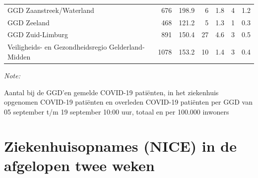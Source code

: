\documentclass[
  english,
  man,floatsintext]{apa6}
\begin{document}
\begin{table}
\begin{threeparttable}
\begin{tabular}{lrrrrrr}
GGD Zaanstreek/Waterland & 676 & 198.9 & 6 & 1.8 & 4 & 1.2\\
GGD Zeeland & 468 & 121.2 & 5 & 1.3 & 1 & 0.3\\
GGD Zuid-Limburg & 891 & 150.4 & 27 & 4.6 & 3 & 0.5\\
Veiligheids- en Gezondheidsregio Gelderland-Midden & 1078 & 153.2 & 10 & 1.4 & 3 & 0.4\\
\bottomrule
\end{tabular}
\begin{tablenotes}
\item \textit{Note: } 
\item Aantal bij de GGD’en gemelde COVID-19 patiënten, in het ziekenhuis opgenomen COVID-19 patiënten en overleden COVID-19 patiënten per GGD van 05 september t/m 19 september 10:00 uur, totaal en per 100.000 inwoners
\end{tablenotes}
\end{threeparttable}
\endgroup{}
\end{table}

\newpage

\hypertarget{ziekenhuisopnames-nice-in-de-afgelopen-twee-weken}{%
\section{Ziekenhuisopnames (NICE) in de afgelopen twee weken}\label{ziekenhuisopnames-nice-in-de-afgelopen-twee-weken}}
\end{document}
